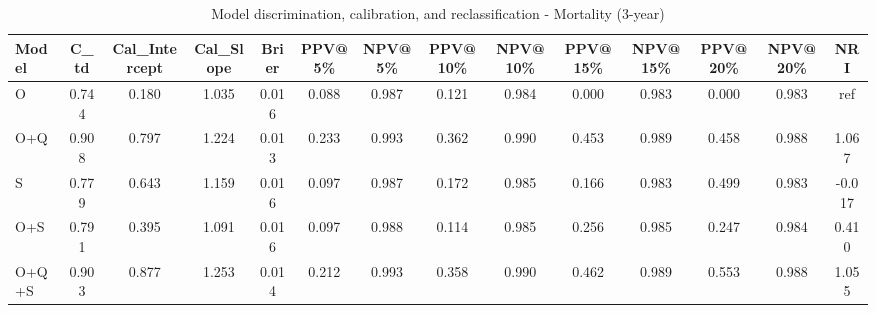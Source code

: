 \begin{table}[htbp]
\centering
\small
\caption{Model discrimination, calibration, and reclassification - Mortality (3-year)}
\label{tab:perf_mortality_3y}
\begin{tabular}{lccccccccccccc}
\toprule
Model & C\_td & Cal\_Intercept & Cal\_Slope & Brier & PPV@5\% & NPV@5\% & PPV@10\% & NPV@10\% & PPV@15\% & NPV@15\% & PPV@20\% & NPV@20\% & NRI \\
\midrule
O & 0.744 & 0.180 & 1.035 & 0.016 & 0.088 & 0.987 & 0.121 & 0.984 & 0.000 & 0.983 & 0.000 & 0.983 & ref \\
O+Q & 0.908 & 0.797 & 1.224 & 0.013 & 0.233 & 0.993 & 0.362 & 0.990 & 0.453 & 0.989 & 0.458 & 0.988 & 1.067 \\
S & 0.779 & 0.643 & 1.159 & 0.016 & 0.097 & 0.987 & 0.172 & 0.985 & 0.166 & 0.983 & 0.499 & 0.983 & -0.017 \\
O+S & 0.791 & 0.395 & 1.091 & 0.016 & 0.097 & 0.988 & 0.114 & 0.985 & 0.256 & 0.985 & 0.247 & 0.984 & 0.410 \\
O+Q+S & 0.903 & 0.877 & 1.253 & 0.014 & 0.212 & 0.993 & 0.358 & 0.990 & 0.462 & 0.989 & 0.553 & 0.988 & 1.055 \\
\bottomrule
\end{tabular}
\end{table}